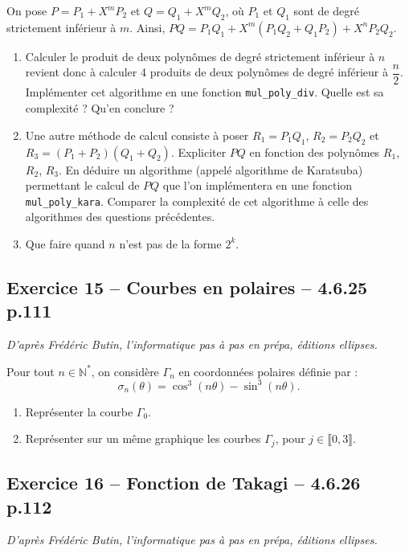\documentclass[10pt,fleqn]{article} %
\begin{document}
\begin{multicols}{2}
On pose $P=P_1+X^m P_2$ et $Q=Q_1+X^mQ_2$, où $P_1$ et $Q_1$ sont de degré strictement inférieur à $m$. Ainsi, $PQ=P_1Q_1+X^m\left(P_1Q_2 + Q_1P_2\right)+X^n P_2 Q_2$. 

\begin{enumerate}
\item Calculer le produit de deux polynômes de degré strictement inférieur à $n$ revient donc à calculer 4 produits de deux polynômes de degré inférieur à $\dfrac{n}{2}$. Implémenter cet algorithme en une fonction \texttt{mul\_poly\_div}. Quelle est sa complexité ? Qu'en conclure ?
\item Une autre méthode de calcul consiste à poser $R_1=P_1Q_1$, $R_2=P_2Q_2$ et $R_3=\left(P_1+P_2 \right)\left(Q_1+Q_2 \right)$. Expliciter $PQ$ en fonction des polynômes $R_1$, $R_2$, $R_3$. En déduire un algorithme (appelé algorithme de Karatsuba) permettant le calcul de $PQ$ que l'on implémentera en une fonction \texttt{mul\_poly\_kara}. Comparer la complexité de cet algorithme à celle des algorithmes des questions précédentes. 
\item Que faire quand $n$ n'est pas de la forme $2^k$.
\end{enumerate}


\subsection*{Exercice 15 -- Courbes en polaires -- 4.6.25 p.111}
\begin{flushright}
\textit{D'après Frédéric Butin, l'informatique pas à pas en prépa, éditions ellipses.}
\end{flushright}

Pour tout $n \in \mathbb{N}^*$, on considère $\Gamma_n$ en coordonnées polaires définie par :
$$
\sigma_n(\theta) = \cos^3 \left( n\theta\right) - \sin^3 \left( n\theta\right).
$$
\begin{enumerate}
\item Représenter la courbe $\Gamma_0$.
\item Représenter sur un même graphique les courbes $\Gamma_j$, pour $j \in \llbracket 0,3\rrbracket $.
\end{enumerate}


\subsection*{Exercice 16 -- Fonction de Takagi -- 4.6.26 p.112}
\begin{flushright}
\textit{D'après Frédéric Butin, l'informatique pas à pas en prépa, éditions ellipses.}
\end{flushright}


\end{multicols}
\end{document}
